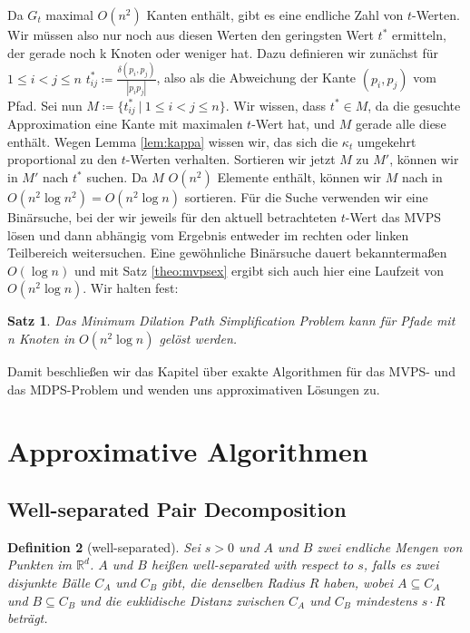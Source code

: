 \documentclass[11pt]{article}
\newcommand{\R}{\mathbb{R}}
\newtheorem{theorem}{Satz}[section]
\newtheorem{definition}[theorem]{Definition}
\begin{document}
	Da $G_t$ maximal $O(n^2)$ Kanten enthält, gibt es eine endliche Zahl von $t$-Werten. Wir müssen also nur noch aus diesen Werten den geringsten Wert $t^*$ ermitteln, der gerade noch k Knoten oder weniger hat. Dazu definieren wir zunächst für $1\leq i < j \leq n$ $t^*_{ij} \coloneqq\frac{\delta(p_i, p_j)}{|p_i p_j|}$, also als die Abweichung der Kante $(p_i, p_j)$ vom Pfad. Sei nun $M\coloneqq\{t^*_{ij}\ |\ 1\leq i < j \leq n\}$. Wir wissen, dass $t^* \in M$, da die gesuchte Approximation eine Kante mit maximalen $t$-Wert hat, und $M$ gerade alle diese enthält. Wegen Lemma \ref{lem:kappa} wissen wir, das sich die $\kappa_t$ umgekehrt proportional zu den $t$-Werten verhalten. Sortieren wir jetzt $M$ zu $M'$, können wir in $M'$ nach $t^*$ suchen. Da $M$ $O(n^2)$ Elemente enthält, können wir $M$ nach \cite{hagerup} in $O(n^2\log n^2)=O(n^2\log n)$ sortieren. Für die Suche verwenden wir eine Binärsuche, bei der wir jeweils für den aktuell betrachteten $t$-Wert das MVPS lösen und dann abhängig vom Ergebnis entweder im rechten oder linken Teilbereich weitersuchen. 
	Eine gewöhnliche Binärsuche dauert bekanntermaßen $O(\log n)$ und mit Satz \ref{theo:mvpsex} ergibt sich auch hier eine Laufzeit von $O(n^2\log n)$. Wir halten fest:
	\begin{theorem}
		Das Minimum Dilation Path Simplification Problem kann für Pfade mit n Knoten in $O(n^2 \log n)$ gelöst werden.
	\end{theorem}
	
	Damit beschließen wir das Kapitel über exakte Algorithmen für das MVPS- und das MDPS-Problem und wenden uns approximativen Lösungen zu.

    \section{Approximative Algorithmen}
    \label{sec:approximative}
    

    \subsection{Well-separated Pair Decomposition}
    \label{subsec:wspd}
    
    \begin{definition}[well-separated]
    	\label{def:wellsep}
    	Sei $s > 0$ und $A$ und $B$ zwei endliche Mengen von Punkten im $\R^d$. $A$ und $B$ heißen well-separated with respect to $s$, falls es zwei disjunkte Bälle $C_A$ und $C_B$ gibt, die denselben Radius $R$ haben, wobei $A \subseteq C_A$ und $B \subseteq C_B$ und die euklidische Distanz zwischen $C_A$ und $C_B$ mindestens $s\cdot R$ beträgt.
    \end{definition}
    
\end{document}
